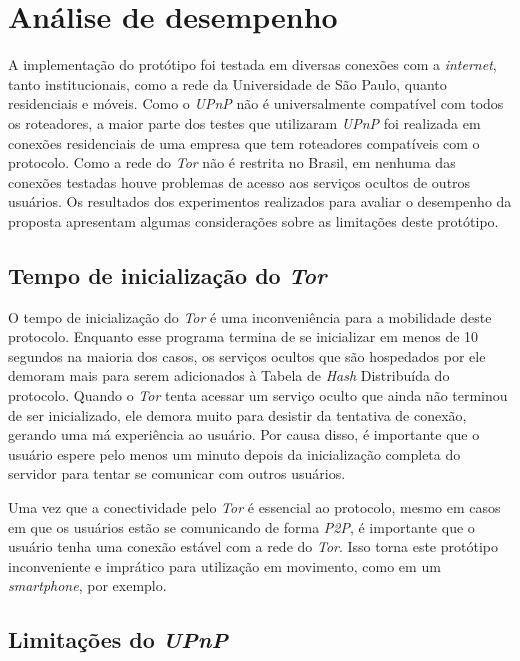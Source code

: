 \chapter{Análise de desempenho}

A implementação do protótipo foi testada em diversas conexões com a \textit{internet}, tanto institucionais, como a rede da Universidade de São Paulo, quanto residenciais e móveis. Como o \textit{UPnP} não é universalmente compatível com todos os roteadores, a maior parte dos testes que utilizaram \textit{UPnP} foi realizada em conexões residenciais de uma empresa que tem roteadores compatíveis com o protocolo. Como a rede do \textit{Tor} não é restrita no Brasil, em nenhuma das conexões testadas houve problemas de acesso aos serviços ocultos de outros usuários. Os resultados dos experimentos realizados para avaliar o desempenho da proposta apresentam algumas considerações sobre as limitações deste protótipo.

\section{Tempo de inicialização do \textit{Tor}}

O tempo de inicialização do \textit{Tor} é uma inconveniência para a mobilidade deste protocolo. Enquanto esse programa termina de se inicializar em menos de 10 segundos na maioria dos casos, os serviços ocultos que são hospedados por ele demoram mais para serem adicionados à Tabela de \textit{Hash} Distribuída do protocolo. Quando o \textit{Tor} tenta acessar um serviço oculto que ainda não terminou de ser inicializado, ele demora muito para desistir da tentativa de conexão, gerando uma má experiência ao usuário. Por causa disso, é importante que o usuário espere pelo menos um minuto depois da inicialização completa do servidor para tentar se comunicar com outros usuários.

Uma vez que a conectividade pelo \textit{Tor} é essencial ao protocolo, mesmo em casos em que os usuários estão se comunicando de forma \textit{P2P}, é importante que o usuário tenha uma conexão estável com a rede do \textit{Tor}. Isso torna este protótipo inconveniente e imprático para utilização em movimento, como em um \textit{smartphone}, por exemplo.

\section{Limitações do \textit{UPnP}}

